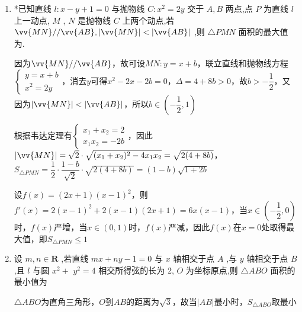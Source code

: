 \begin{enumerate}
\begin{jieda}
\begin{dingautolist}{172}
            令$t = k^2+1, t \in [1, +\infty)$，则$S = 4\sqrt{\dfrac{t^2}{2t^2+t-1}} = \dfrac{4}{\sqrt{2+\dfrac{1}{t}-\dfrac{1}{t^2}}} \geq \dfrac{8}{3}$
        \end{dingautolist}
    \end{jieda}
    \item *已知直线 $l : x - y + 1 = 0$ 与抛物线 $C : {x}^{2} = {2y}$ 交于 $A,B$ 两点,点 $P$ 为直线 $l$ 上一动点, $M$ , $N$ 是抛物线 $C$ 上两个动点,若 $\vv{MN}//\vv{AB},\left| \vv{MN}\right|  < \left| \vv{AB}\right|$ ,则 $\bigtriangleup {PMN}$ 面积的最大值为.
    \begin{jieda}
        因为$\vv{MN}//\vv{AB}$，故可设$MN: y = x + b$，联立直线和抛物线方程$\left\{\begin{array}{l}
             y = x + b \\
             x^2 = 2y
        \end{array}\right.$，消去$y$可得$x^2 - 2x - 2b = 0$，$\Delta = 4+8b > 0$，故$b > -\dfrac{1}{2}$，又因为$\left|\vv{MN}\right|  < \left| \vv{AB}\right|$，所以$b \in \left(-\dfrac{1}{2}, 1\right)$

        根据韦达定理有$\left\{\begin{array}{l}
             x_1+x_2 = 2 \\
             x_1x_2 = -2b
        \end{array}\right.$，因此$|\vv{MN}| = \sqrt{2} \cdot \sqrt{(x_1+x_2)^2-4x_1x_2} = \sqrt{2(4+8b)}$，$S_{\bigtriangleup {PMN}} = \dfrac{1}{2} \cdot \dfrac{1-b}{\sqrt{2}} \cdot \sqrt{2(4+8b)} = (1-b)\sqrt{1+2b}$

        设$f(x) = (2x+1)(x-1)^2$，则$f'(x) = 2(x-1)^2 + 2(x-1)(2x+1) = 6x(x-1)$，当$x \in \left(-\dfrac{1}{2}, 0\right)$时，$f(x)$严增，当$x \in (0, 1)$时，$f(x)$严减，因此$f(x)$在$x = 0$处取得最大值，即$S_{\bigtriangleup {PMN}} \leq 1$
    \end{jieda}
    \item 设 $m,n \in  \mathbf{R}$ ,若直线 ${mx} + {ny} - 1 = 0$ 与 $x$ 轴相交于点 $A$ ,与 $y$ 轴相交于点 $B$ ,且 $l$ 与圆 ${x}^{2} +$  ${y}^{2} = 4$ 相交所得弦的长为 2, $O$ 为坐标原点,则 $\bigtriangleup  {ABO}$ 面积的最小值为
    \begin{jieda}
        $\triangle ABO$为直角三角形，$O$到$AB$的距离为$\sqrt{3}$，故当$|AB|$最小时，$S_{\triangle ABO}$取最小


\end{jieda}
\end{enumerate}
